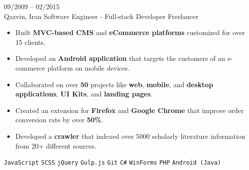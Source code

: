 \entry
{09/2009 -- 02/2015 \\ Qazvin, Iran}
{Software Engineer - Full-stack Developer}
{Freelancer}
{\vspace{-10pt}
    \begin{itemize}[noitemsep,topsep=0pt,parsep=0pt,partopsep=0pt, leftmargin=-1pt]
        \item Built \textbf{MVC-based CMS} and \textbf{eCommerce platforms} customized for over 15 clients.
        \item Developed an \textbf{Android application} that targets the customers of an e-commerce platform on mobile devices.
        \item Collaborated on over \textbf{50} projects like \textbf{web}, \textbf{mobile}, and \textbf{desktop applications}, \textbf{UI Kits}, and \textbf{landing pages}.
        \item Created an extension for \textbf{Firefox} and \textbf{Google Chrome} that improve order conversion rate by over \textbf{50\%}.
        \item Developed a \textbf{crawler} that indexed over 5000 scholarly literature information from 20+ different sources.
    \end{itemize}
    \texttt{JavaScript} \slashsep \texttt{SCSS} \slashsep \texttt{jQuery} \slashsep \texttt{Gulp.js} \slashsep \texttt{Git} \slashsep \texttt{C\#} \slashsep \texttt{WinForms} \slashsep \texttt{PHP} \slashsep \texttt{Android (Java)}
}
